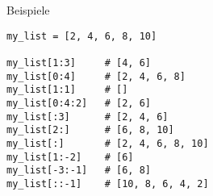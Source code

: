 \begin{fragile}
\begin{exampleblock}{Beispiele}
\begin{overprint}
\begin{verbatim}
my_list = [2, 4, 6, 8, 10]

my_list[1:3]     # [4, 6]
my_list[0:4]     # [2, 4, 6, 8]
my_list[1:1]     # []
my_list[0:4:2]   # [2, 6]
my_list[:3]      # [2, 4, 6]
my_list[2:]      # [6, 8, 10]
my_list[:]       # [2, 4, 6, 8, 10]
my_list[1:-2]    # [6]
my_list[-3:-1]   # [6, 8] 
my_list[::-1]    # [10, 8, 6, 4, 2]  
\end{verbatim}

\end{overprint}
\end{exampleblock}
\end{fragile}



